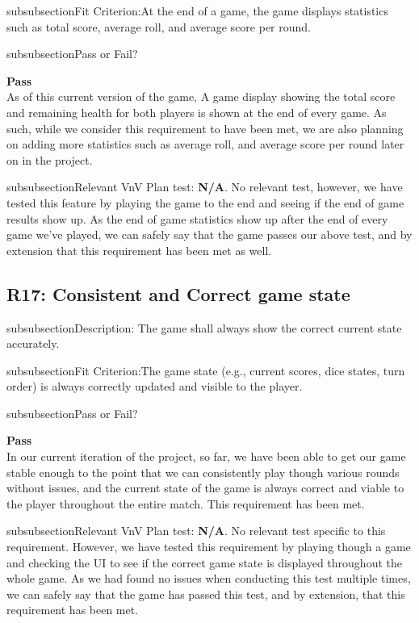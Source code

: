 \documentclass[12pt, titlepage]{article}
\begin{document}
\*subsubsection{Fit Criterion:}At the end of a game, the game displays statistics such as total score, average roll, and average score per round.

\*subsubsection{Pass or Fail?} 

 \noindent \textbf{Pass}\\
 
 \noindent As of this current version of the game, A game display showing the total score and remaining health for both players is shown at the end of every game. As such, while we consider this requirement to have been met, we are also planning on adding more statistics such as average roll, and average score per round later on in the project.
 
 \*subsubsection{Relevant VnV Plan test: } \textbf{N/A}. No relevant test, however, we have tested this feature by playing the game to the end and seeing if the end of game results show up. As the end of game statistics show up after the end of every game we've played, we can safely say that the game passes our above test, and by extension that this requirement has been met as well.

\subsection{R17: Consistent and Correct game state} 

\*subsubsection{Description:} The game shall always show the correct current state accurately.

\*subsubsection{Fit Criterion:}The game state (e.g., current scores, dice states, turn order) is always correctly updated and visible to the player.

\*subsubsection{Pass or Fail?} 

 \noindent \textbf{Pass}\\
 
 \noindent In our current iteration of the project, so far, we have been able to get our game stable enough to the point that we can consistently play though various rounds without issues, and the current state of the game is always correct and viable to the player throughout the entire match. This requirement has been met.
 
 \*subsubsection{Relevant VnV Plan test: } \textbf{N/A}. No relevant test specific to this requirement. However, we have tested this requirement by  playing though a game and checking the UI to see if the correct game state is displayed throughout the whole game. As we had found no issues when conducting this test multiple times, we can safely say that the game has passed this test, and by extension, that this requirement has been met.
\end{document}
